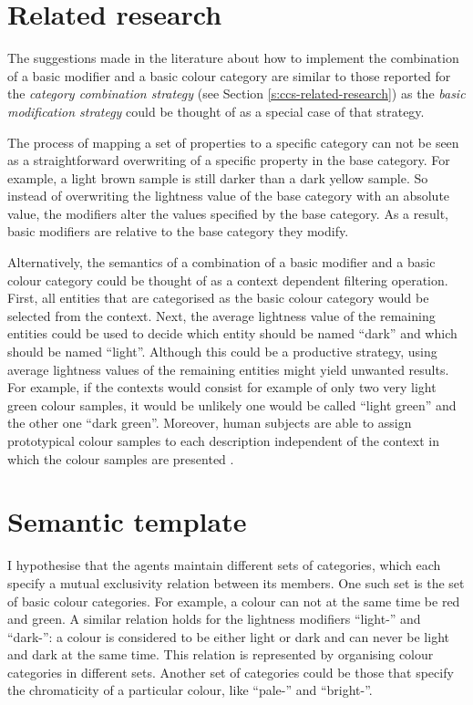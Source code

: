 \section{Related research}

The suggestions made in the literature about how to implement the
combination of a basic modifier and a basic colour category are
similar to those reported for the \emph{category combination strategy}
(see Section \ref{s:ccs-related-research}) as the \emph{basic
  modification strategy} could be thought of as a special case of that
strategy.

The process of mapping a set of properties to a specific category can
not be seen as a straightforward overwriting of a specific property
in the base category. For example, a light brown sample is still
darker than a dark yellow sample. So instead of overwriting the
lightness value of the base category with an absolute value, the
modifiers alter the values specified by the base category. As a
result, basic modifiers are relative to the base category they
modify.

Alternatively, the semantics of a combination of a basic
modifier and a basic colour category could be thought of as a context
dependent filtering operation. First, all entities that are categorised
as the basic colour category would be selected from the context. Next,
the average lightness value of the remaining entities could be used to
decide which entity should be named ``dark'' and which should be named
``light''. Although this could be a productive strategy, using  average lightness
values of the remaining entities might yield unwanted results. For example, 
if the contexts would consist for example of
only two very light green colour samples, it would be unlikely one would
be called ``light green'' and the other one ``dark green''. Moreover,
human subjects are able to assign prototypical colour samples to each
description independent of the context in which the colour samples are
presented \citep{safuanova07russian}.

\section{Semantic template}

I hypothesise that the agents maintain different sets of categories,
which each specify a mutual exclusivity relation between its
members. One such set is the set of basic colour categories. For
example, a colour can not at the same time be red and green. A similar
relation holds for the lightness modifiers ``light-'' and ``dark-'':
a colour is considered to be either light or dark and can never be
light and dark at the same time. This relation is represented by
organising colour categories in different sets. Another set of
categories could be those that specify the chromaticity of a
particular colour, like ``pale-'' and ``bright-''.

